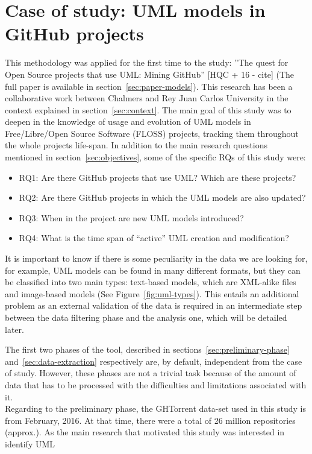\documentclass[a4paper, 12pt]{book}
\begin{document}
\section{Case of study: UML models in GitHub projects}
\label{sec:case-study-uml}
This methodology was applied for the first time to the study: ”The quest for Open Source projects that use
UML: Mining GitHub” [HQC + 16 - cite] (The full paper is available in section~\ref{sec:paper-models}).
This research has been a collaborative work between Chalmers and Rey Juan Carlos University in the context
explained in section~\ref{sec:context}.
The main goal of this study was to deepen in the knowledge of usage and evolution of UML models in
Free/Libre/Open Source Software (FLOSS) projects, tracking them throughout the whole projects life-span.
In addition to the main research questions mentioned in section~\ref{sec:objectives}, some of the specific RQs
of this study were:
\begin{itemize}
  \item RQ1: Are there GitHub projects that use UML? Which are these projects?
  \item RQ2: Are there GitHub projects in which the UML models are also updated?
  \item RQ3: When in the project are new UML models introduced?
  \item RQ4: What is the time span of ``active'' UML creation and modification?
\end{itemize}
It is important to know if there is some peculiarity in the data we are looking for, for example, UML models can be
found in many different formats, but they can be classified into two main types: text-based models, which are XML-alike
files and image-based models (See Figure~\ref{fig:uml-types}). This entails an additional problem as an external validation of the data is
required in an intermediate step between the data filtering phase and the analysis one, which will be detailed later.\par
The first two phases of the tool, described in sections~\ref{sec:preliminary-phase} and~\ref{sec:data-extraction} respectively
are, by default, independent from the case of study. However, these phases are not a trivial task because of the amount of
data that has to be processed with the difficulties and limitations associated with it.\\
Regarding to the preliminary phase, the GHTorrent data-set used in this study is from February, 2016. At that time, there were
a total of 26 million repositories (approx.). As the main research that motivated this study was interested in identify UML
\end{document}
